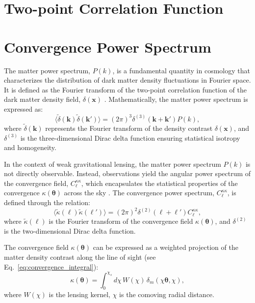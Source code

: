 \section{Two-point Correlation Function}

\section{Convergence Power Spectrum}
The matter power spectrum, \( P(k) \), is a fundamental quantity in cosmology that characterizes the distribution of dark matter density fluctuations in Fourier space. It is defined as the Fourier transform of the two-point correlation function of the dark matter density field, \( \delta(\mathbf{x}) \) \citep{2001PhR...340..291B}. Mathematically, the matter power spectrum is expressed as:
\begin{equation}
    \langle \tilde{\delta}(\mathbf{k}) \tilde{\delta}(\mathbf{k}') \rangle = (2\pi)^3 \delta^{(3)}(\mathbf{k} + \mathbf{k}') P(k),
    \label{eq:matter_power_spectrum}
\end{equation}
where \( \tilde{\delta}(\mathbf{k}) \) represents the Fourier transform of the density contrast \( \delta(\mathbf{x}) \), and \( \delta^{(3)} \) is the three-dimensional Dirac delta function ensuring statistical isotropy and homogeneity.

In the context of weak gravitational lensing, the matter power spectrum \( P(k) \) is not directly observable. Instead, observations yield the angular power spectrum of the convergence field, \( C_{\ell}^{\kappa\kappa} \), which encapsulates the statistical properties of the convergence \( \kappa(\boldsymbol{\theta}) \) across the sky \citep{2001PhR...340..291B}. The convergence power spectrum, \( C_{\ell}^{\kappa\kappa} \), is defined through the relation:
\begin{equation}
    \langle \tilde{\kappa}(\boldsymbol{\ell}) \tilde{\kappa}(\boldsymbol{\ell}') \rangle = (2\pi)^2 \delta^{(2)}(\boldsymbol{\ell} + \boldsymbol{\ell}') C^{\kappa\kappa}_\ell,
    \label{eq:convergence_power_spectrum}
\end{equation}
where \( \tilde{\kappa}(\boldsymbol{\ell}) \) is the Fourier transform of the convergence field \( \kappa(\boldsymbol{\theta}) \), and \( \delta^{(2)} \) is the two-dimensional Dirac delta function.

The convergence field \( \kappa(\boldsymbol{\theta}) \) can be expressed as a weighted projection of the matter density contrast along the line of sight (see Eq.~\eqref{eq:convergence_integral}):
\begin{equation}
    \kappa(\boldsymbol{\theta}) = \int_0^{\chi_s} d\chi \, W(\chi) \, \delta_m\left(\chi \boldsymbol{\theta}, \chi\right),
    \label{eq:kappa_projection}
\end{equation}
where \( W(\chi) \) is the lensing kernel, \( \chi \) is the comoving radial distance.

